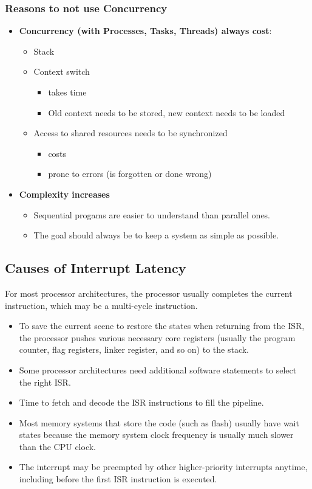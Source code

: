 \subsubsection{Reasons to not use Concurrency}
\begin{itemize}
	\item \textbf{Concurrency (with Processes, Tasks, Threads) always cost}:
	      \begin{itemize}
		      \item Stack
		      \item Context switch
		            \begin{itemize}
			            \item takes time
			            \item Old context needs to be stored, new context needs to be loaded
		            \end{itemize}
		      \item Access to shared resources needs to be synchronized
		            \begin{itemize}
			            \item costs
			            \item prone to errors (is forgotten or done wrong)
		            \end{itemize}
	      \end{itemize}
	\item \textbf{Complexity increases}
	      \begin{itemize}
		      \item Sequential progams are easier to understand than parallel ones.
		      \item The goal should always be to keep a system as simple as possible.
	      \end{itemize}
\end{itemize}

\subsection{Causes of Interrupt Latency}
For most processor architectures, the processor usually completes the current instruction, which may be a multi-cycle instruction.
\begin{itemize}
	\item To save the current scene to restore the states when returning from the ISR, the processor pushes various necessary core registers (usually the program counter, flag registers, linker register, and so on) to the stack.
	\item Some processor architectures need additional software statements to select the right ISR.
	\item Time to fetch and decode the ISR instructions to fill the pipeline.
	\item Most memory systems that store the code (such as flash) usually have wait states because the memory system clock frequency is usually much slower than the CPU clock.
	\item The interrupt may be preempted by other higher-priority interrupts anytime, including before the first ISR instruction is executed.
\end{itemize}


